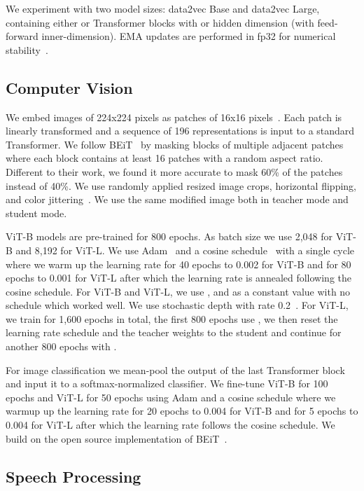 \documentclass[nohyperref]{article}
\theoremstyle{plain}
\theoremstyle{definition}
\theoremstyle{remark}
\newcommand{\name}{data2vec}
\begin{document}
We experiment with two model sizes: \name{} Base and \name{} Large, containing either  or  Transformer blocks with  or  hidden dimension (with  feed-forward inner-dimension). 
EMA updates are performed in fp32 for numerical stability~\citep{manohar2021kaizen}.


\subsection{Computer Vision}
\label{sec:setup_cv}

We embed images of 224x224 pixels as patches of 16x16 pixels~\citep{dosovitskiy2020vit}.
Each patch is linearly transformed and a sequence of 196 representations is input to a standard Transformer.
We follow BEiT~\citep{bao2021beit} by masking blocks of multiple adjacent patches where each block contains at least 16 patches with a random aspect ratio.
Different to their work, we found it more accurate to mask 60\% of the patches instead of 40\%.
We use randomly applied resized image crops, horizontal flipping, and color jittering~\citep{bao2021beit}. 
We use the same modified image both in teacher mode and student mode.

ViT-B models are pre-trained for 800 epochs.
As batch size we use 2,048 for ViT-B and 8,192 for ViT-L.
We use Adam~\citep{kingma2015adam} and a cosine schedule~\citep{loshchilov2016cosine} with a single cycle where we warm up the learning rate for 40 epochs to 0.002 for ViT-B and for 80 epochs to 0.001 for ViT-L after which the learning rate is annealed following the cosine schedule.
For ViT-B and ViT-L, we use ,  and  as a constant value with no schedule which worked well.
We use stochastic depth with rate 0.2~\citep{huang2016deep}.
For ViT-L, we train for 1,600 epochs in total, the first 800 epochs use , we then reset the learning rate schedule and the teacher weights to the student and continue for another 800 epochs with .

For image classification we mean-pool the output of the last Transformer block and input it to a softmax-normalized classifier.
We fine-tune ViT-B for 100 epochs and ViT-L for 50 epochs using Adam and a cosine schedule where we warmup up the learning rate for 20 epochs to 0.004 for ViT-B and for 5 epochs to 0.004 for ViT-L after which the learning rate follows the cosine schedule. 
We build on the open source implementation of BEiT~\citep{bao2021beit}.

\subsection{Speech Processing}
\label{sec:setup_speech}
\end{document}
